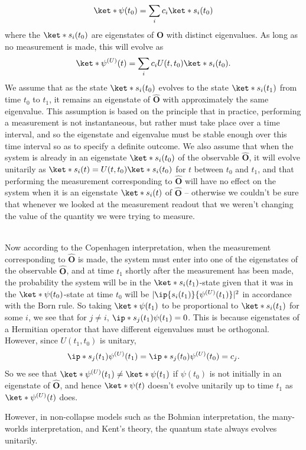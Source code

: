 \documentclass[12pt]{report}
\begin{document}
{  $$\ket*{\psi(t_0)}=\sum_i c_i\ket*{s_i(t_0)}$$
 where the $\ket*{s_i(t_0)}$ are eigenstates of $\hat{\bm{O}}$ with distinct eigenvalues. As long as no measurement is made, this will evolve as 
 $$\ket*{\psi^{(U)}(t)}=\sum_i c_iU(t,t_0)\ket*{s_i(t_0)}.$$  
 We assume that as the state $\ket*{s_i(t_0)}$ evolves to the state $\ket*{s_i(t_1)}$ from time $t_0$ to $t_1$, it remains an eigenstate of $\hat{\bm{O}}$ with approximately the same eigenvalue. This assumption is based on the principle that in practice, performing a measurement is not instantaneous, but rather must take place over a time interval, and so the eigenstate and eigenvalue must be stable enough over this time interval so as to specify a definite outcome. We also assume that when the system is already in an eigenstate $\ket*{s_i(t_0)}$ of the observable $\hat{\bm{O}}$, it will evolve unitarily as $\ket*{s_i(t)}=U(t,t_0)\ket*{s_i(t_0)}$ for $t$ between $t_0$ and $t_1$, and that performing the measurement corresponding to $\hat{\bm{O}}$ will have no effect on the system when it is an eigenstate  $\ket*{s_i(t)}$ of $\hat{\bm{O}}$ -- otherwise we couldn't be sure that whenever we looked at the measurement readout that we weren't changing the value of the quantity we were trying to measure. \strut \\[\baselineskip]
Now according to the Copenhagen interpretation, when the measurement corresponding to $\hat{\bm{O}}$ is made, the system must enter into one of the eigenstates of the observable $\hat{\bm{O}}$, and at time $t_1$ shortly after the measurement has been made, the probability the system will be in the $\ket*{s_i(t_1)}$-state given that it was in the $\ket*{\psi(t_0)}$-state at time $t_0$ will be $|\ip{s_i(t_1)}{\psi^{(U)}(t_1)}|^2$ in accordance with the Born rule. So taking $\ket*{\psi(t_1)}$ to be proportional to $\ket*{s_i(t_1)}$ for some $i$, we see that for $j\neq i$, $\ip*{s_j(t_1)}{\psi(t_1)}=0$. This is because eigenstates of a Hermitian operator that have different eigenvalues must be orthogonal. However, since $U(t_1,t_0)$ is unitary,
 $$\ip*{s_j(t_1)}{\psi^{(U)}(t_1)}=\ip*{s_j(t_0)}{\psi^{(U)}(t_0)}=c_j.$$
 So we see that $\ket*{\psi^{(U)}(t_1)}\neq\ket*{\psi(t_1)}$ if $\psi(t_0)$ is not initially in an eigenstate of $\hat{\bm{O}}$, and hence $\ket*{\psi(t)}$ doesn't evolve unitarily up to time $t_1$ as $\ket*{\psi^{(U)}(t)}$ does.} However, in non-collapse models  such as the Bohmian interpretation, the many-worlds interpretation, and Kent's theory, the quantum state always evolves unitarily. 

\end{document}

